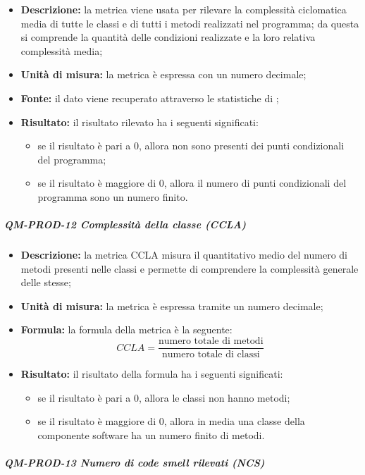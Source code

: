 			\begin{itemize}
      			\item \textbf{Descrizione: }
					la metrica viene usata per rilevare la complessità ciclomatica media di tutte le classi e di tutti i metodi realizzati nel programma; da questa si comprende la quantità delle condizioni realizzate e la loro relativa complessità media;
				\item \textbf{Unità di misura: }
					la metrica è espressa con un numero decimale;
				\item \textbf{Fonte: }
					il dato viene recuperato attraverso le statistiche di ;
				\item \textbf{Risultato: }
					il risultato rilevato ha i seguenti significati:
					\begin{itemize}
						\item se il risultato è pari a 0, allora non sono presenti dei punti condizionali del programma;
						\item se il risultato è maggiore di 0, allora il numero di punti condizionali del programma sono un numero finito.
					\end{itemize}
			\end{itemize}
			\subparagraph{QM-PROD-12 Complessità della classe (CCLA)}
			\begin{itemize}
      			\item \textbf{Descrizione: }
					la metrica CCLA misura il quantitativo medio del numero di metodi presenti nelle classi e permette di comprendere la complessità generale delle stesse;
				\item \textbf{Unità di misura: }
					la metrica è espressa tramite un numero decimale;
				\item \textbf{Formula: }
					la formula della metrica è la seguente:
					\[
				 		CCLA = \frac{\text{numero totale di metodi}}{\text{numero totale di classi}}
				 	\]
				\item \textbf{Risultato: }
					il risultato della formula ha i seguenti significati:
					\begin{itemize}
						\item se il risultato è pari a 0, allora le classi non hanno metodi;
						\item se il risultato è maggiore di 0, allora in media una classe della componente software ha un numero finito di metodi.
					\end{itemize}
			\end{itemize}
			\subparagraph{QM-PROD-13 Numero di code smell rilevati (NCS)}
